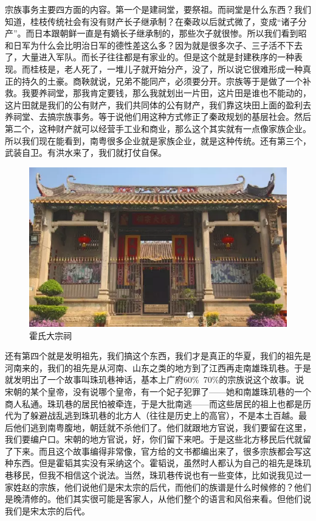 宗族事务主要四方面的内容。第一个是建祠堂，要祭祖。而祠堂是什么东西？我们知道，桂枝传统社会有没有财产长子继承制？在秦政以后就式微了，变成“诸子分产”。而日本跟朝鲜一直是有嫡长子继承制的，那些次子就很惨。所以我们看到昭和日军为什么会比明治日军的德性差这么多？因为就是很多次子、三子活不下去了，大量进入军队。而长子往往都是有家业的。但是这个就是封建秩序的一种表现。而桂枝是，老人死了，一堆儿子就开始分产，没了，所以说它很难形成一种真正的持久的土豪。商鞅就说，兄弟不能同产，必须要分开。宗族等于是做了一个补救。我要养祠堂，那我肯定要钱，那么我就划出一片田，这片田是谁也不能动的，这片田就是我们的公有财产，我们共同体的公有财产，我们靠这块田上面的盈利去养祠堂、去搞宗族事务。等于说他们用这种方式修正了秦政规划的基层社会。然后第二个，这种财产就可以经营手工业和商业，那么这个其实就有一点像家族企业。所以我们现在能看到，南粤很多企业就是家族企业，就是这种传统。还有第三个，武装自卫。有洪水来了，我们就打仗自保。

\begin{figure}
	\centering
	\includegraphics[width=\textwidth]{images/image-58}
	\caption{霍氏大宗祠}
\end{figure}

还有第四个就是发明祖先，我们搞这个东西，我们才是真正的华夏，我们的祖先是河南来的，我们的祖先是从河南、山东之类的地方到了江西再走南雄珠玑巷。于是就发明出了一个故事叫珠玑巷神话，基本上广府60\%~70\%的宗族说这个故事。说宋朝的某个皇帝，没有说哪个皇帝，有一个妃子犯罪了——她和南雄珠玑巷的一个商人私通。珠玑巷的居民怕被牵连，于是大批南逃——而这些居民的祖上也都是历代为了躲避战乱逃到珠玑巷的北方人（往往是历史上的高官），不是本土百越。最后他们逃到南粤腹地，朝廷就不杀他们了。他们就跟地方官说，我们要留在这里，我们要编户口。宋朝的地方官说，好，你们留下来吧。于是这些北方移民后代就留了下来。而且这个故事编得非常像，官方给的文书都编出来了，很多宗族都会写这种东西。但是霍韬其实没有采纳这个。霍韬说，虽然时人都认为自己的祖先是珠玑巷移民，但我不相信这个说法。当然，珠玑巷传说也有一些变体，比如说我见过一家姓赵的宗族，他们说他们是宋太宗的后代，而他们的族谱是什么时候修的？他们是晚清修的。他们其实很可能是客家人，从他们整个的语言和风俗来看。但他们说我们是宋太宗的后代。

